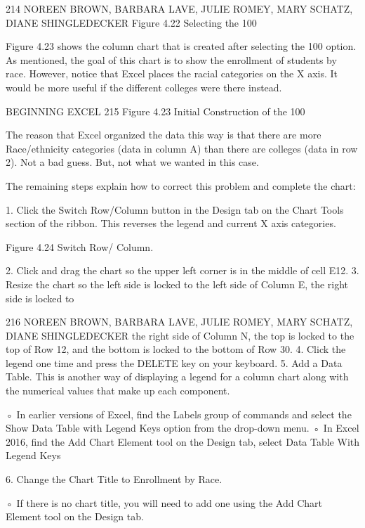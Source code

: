 214 NOREEN BROWN, BARBARA LAVE, JULIE ROMEY, MARY SCHATZ, DIANE SHINGLEDECKER
Figure 4.22 Selecting the 100%


Figure 4.23 shows the column chart that is created after selecting the 100%
option. As mentioned, the goal of this chart is to show the enrollment of students by race. However,
notice that Excel places the racial categories on the X axis. It would be more useful if the different
colleges were there instead.




BEGINNING EXCEL 215
Figure 4.23 Initial Construction of the 100%


The reason that Excel organized the data this way is that there are more Race/ethnicity categories
(data in column A) than there are colleges (data in row 2). Not a bad guess. But, not what we wanted
in this case.

The remaining steps explain how to correct this problem and complete the chart:

1. Click the Switch Row/Column button in the Design tab on the Chart Tools section of the
ribbon. This reverses the legend and current X axis categories.




Figure 4.24 Switch Row/
Column.


2. Click and drag the chart so the upper left corner is in the middle of cell E12.
3. Resize the chart so the left side is locked to the left side of Column E, the right side is locked to


216 NOREEN BROWN, BARBARA LAVE, JULIE ROMEY, MARY SCHATZ, DIANE SHINGLEDECKER
the right side of Column N, the top is locked to the top of Row 12, and the bottom is locked to
the bottom of Row 30.
4. Click the legend one time and press the DELETE key on your keyboard.
5. Add a Data Table. This is another way of displaying a legend for a column chart along with the
numerical values that make up each component.

◦ In earlier versions of Excel, find the Labels group of commands and select the Show Data
Table with Legend Keys option from the drop-down menu.
◦ In Excel 2016, find the Add Chart Element tool on the Design tab, select Data Table With
Legend Keys

6. Change the Chart Title to Enrollment by Race.

◦ If there is no chart title, you will need to add one using the Add Chart Element tool on
the Design tab.

